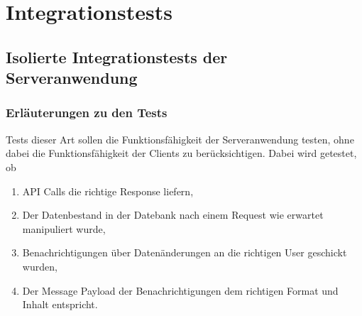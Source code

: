 \documentclass[11pt,a4paper]{scrartcl}
\begin{document}
\newpage

\section{Integrationstests}
\subsection{Isolierte Integrationstests der Serveranwendung}\label{ServerIT}
\subsubsection{Erläuterungen zu den Tests}
Tests dieser Art sollen die Funktionsfähigkeit der Serveranwendung testen, ohne dabei die Funktionsfähigkeit der Clients zu berücksichtigen. Dabei wird getestet, ob
\begin{enumerate}
	\item API Calls die richtige Response liefern,
	\item Der Datenbestand in der Datebank nach einem Request wie erwartet manipuliert wurde,
	\item Benachrichtigungen über Datenänderungen an die richtigen User geschickt wurden,
	\item Der Message Payload der Benachrichtigungen dem richtigen Format und Inhalt entspricht.
\end{enumerate}
\end{document}
